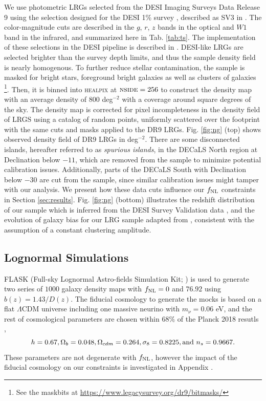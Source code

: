 We use photometric LRGs selected from the DESI Imaging Surveys Data Release 9 \citep[DR9;][]{dey2018overview} using the selection designed for the DESI 1\% survey , described as SV3 in \cite{zhou2021clustering}. The color-magnitude cuts are described in the $g$, $r$, $z$ bands in the optical and $W1$ band in the infrared, and summarized here in Tab. \ref{tab:ts}. The implementation of these selections in the DESI pipeline is described in . DESI-like LRGs are selected brighter than the survey depth limits, and thus the sample density field is nearly homogenous. To further reduce stellar contamination, the sample is masked for bright stars, foreground bright galaxies as well as clusters of galaxies \footnote{See the maskbits at \url{https://www.legacysurvey.org/dr9/bitmasks/}}. Then, it is binned into \textsc{healpix} \citep{gorski2005healpix} at $\textsc{nside}=256$ to construct the density map with an average density of $800$ deg$^{-2}$ with a coverage around  square degrees of the sky. The density map is corrected for pixel incompleteness in the density field of LRGS using a catalog of random points, uniformly scattered over the footprint with the same cuts and masks applied to the DR9 LRGs. Fig. \ref{fig:ng} (top) shows observed density field of DR9 LRGs in deg$^{-2}$. There are some disconnected islands, hereafter referred to as \textit{spurious islands}, in the DECaLS North region at Declination below $-11$, which are removed from the sample to minimize potential calibration issues. Additionally, parts of the DECaLS South with Declination below $-30$ are cut from the sample, since similar calibration issues might tamper with our analysis. We present  how these data cuts influence our $f_{\rm NL}$ constraints in Section \ref{sec:results}. Fig. \ref{fig:ng} (bottom) illustrates the redshift distribution of our sample which is inferred from the DESI Survey Validation data , and the evolution of  galaxy bias for our LRG sample adapted from \cite{zhou2021clustering}, consistent with the assumption of a constant clustering amplitude.

\subsection{Lognormal Simulations}
\textsc{FLASK} (Full-sky Lognormal Astro-fields Simulation Kit; ) is used to generate two series of $1000$ galaxy density maps with $f_{\rm NL}=0$ and $76.92$ using $b(z)=1.43/D(z)$. The fiducial cosmology to generate the mocks is based on a flat $\Lambda$CDM universe including one massive neurino with $m_{\nu}=0.06$ eV, and the rest of cosmological parameters are chosen within $68\%$ of the Planck 2018 resutls ,
\begin{equation*}
    h = 0.67, \Omega_{b}=0.048, \Omega_{cdm}=0.264, \sigma_{8}=0.8225, {\rm and}~ n_{s}=0.9667.
\end{equation*}
These parameters are not degenerate with $f_{\rm NL}$, however the impact of the fiducial cosmology on our constraints is investigated in Appendix .


